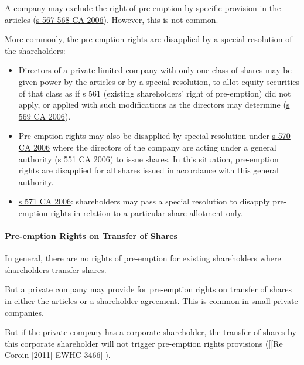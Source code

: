 \documentclass[
]{article}
\providecommand{\tightlist}{%
  \setlength{\itemsep}{0pt}\setlength{\parskip}{0pt}}
\begin{document}
A company may exclude the right of pre-emption by specific provision in
the articles
(\href{https://www.legislation.gov.uk/ukpga/2006/46/section/567}{s
567-568 CA 2006}). However, this is not common.

More commonly, the pre-emption rights are disapplied by a special
resolution of the shareholders:

\begin{itemize}
\tightlist
\item
  Directors of a private limited company with only one class of shares
  may be given power by the articles or by a special resolution, to
  allot equity securities of that class as if s 561 (existing
  shareholders' right of pre-emption) did not apply, or applied with
  such modifications as the directors may determine
  (\href{https://www.legislation.gov.uk/ukpga/2006/46/section/569}{s 569
  CA 2006}).
\item
  Pre-emption rights may also be disapplied by special resolution under
  \href{https://www.legislation.gov.uk/ukpga/2006/46/section/570}{s 570
  CA 2006} where the directors of the company are acting under a general
  authority
  (\href{https://www.legislation.gov.uk/ukpga/2006/46/section/551}{s 551
  CA 2006}) to issue shares. In this situation, pre-emption rights are
  disapplied for all shares issued in accordance with this general
  authority.
\item
  \href{https://www.legislation.gov.uk/ukpga/2006/46/section/571}{s 571
  CA 2006}: shareholders may pass a special resolution to disapply
  pre-emption rights in relation to a particular share allotment only.
\end{itemize}

\hypertarget{pre-emption-rights-on-transfer-of-shares}{%
\paragraph{Pre-emption Rights on Transfer of
Shares}\label{pre-emption-rights-on-transfer-of-shares}}

In general, there are no rights of pre-emption for existing shareholders
where shareholders transfer shares.

But a private company may provide for pre-emption rights on transfer of
shares in either the articles or a shareholder agreement. This is common
in small private companies.

But if the private company has a corporate shareholder, the transfer of
shares by this corporate shareholder will not trigger pre-emption rights
provisions ({[}{[}Re Coroin {[}2011{]} EWHC 3466{]}{]}).
\end{document}
